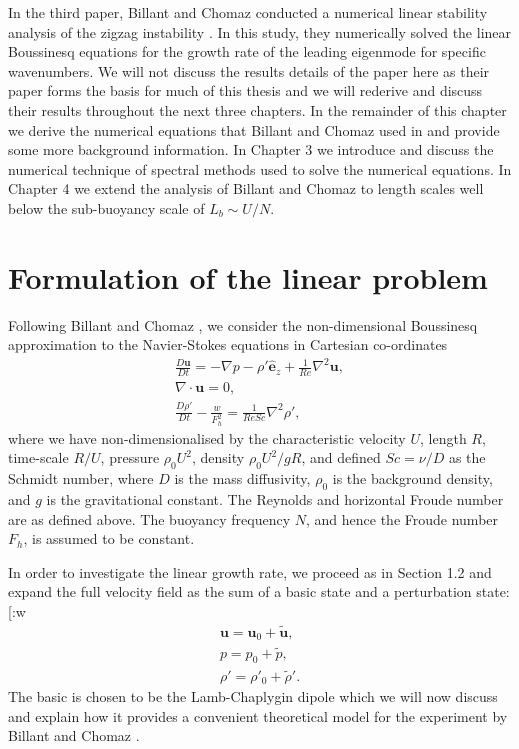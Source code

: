 In the third paper, Billant and Chomaz conducted a numerical linear stability analysis of the zigzag instability \cite{bc2000c}. In this study, they numerically solved the linear Boussinesq equations for the growth rate of the leading eigenmode for specific wavenumbers. We will not discuss the results details of the paper here as their paper forms the basis for much of this thesis and we will rederive and discuss their results throughout the next three chapters. In the remainder of this chapter we derive the numerical equations that Billant and Chomaz used in \cite{bc2000c} and provide some more background information. In Chapter 3 we introduce and discuss the numerical technique of spectral methods used to solve the numerical equations. In Chapter 4 we extend the analysis of Billant and Chomaz to length scales well below the sub-buoyancy scale of $L_{b}\sim U/N$. 

\section{Formulation of the linear problem}
Following Billant and Chomaz \cite{bc2000c}, we consider the non-dimensional Boussinesq approximation to the Navier-Stokes equations in Cartesian co-ordinates 
\begin{align}
\frac{D\bm{u}}{Dt} = -\nabla p - \rho'\hat{\bm{e}}_{z} + \frac{1}{Re}\nabla^{2} \bm{u},\\
\nabla \cdot \bm{u}=0,\\
\frac{D\rho'}{Dt} -\frac{w}{F_{h}^{2}} = \frac{1}{ReSc}\nabla^{2} \rho',
\end{align}
where we have non-dimensionalised by the characteristic velocity $U$, length $R$, time-scale $R/U$, pressure $\rho_{0}U^{2}$, density $\rho_{0}U^{2}/gR$, and defined $Sc=\nu /D$ as the Schmidt number, where $D$ is the mass diffusivity, $\rho_{0}$ is the background density, and $g$ is the gravitational constant. The Reynolds and horizontal Froude number are as defined above. The buoyancy frequency $N$, and hence the Froude number $F_{h}$, is assumed to be constant. 

In order to investigate the linear growth rate, we proceed as in Section 1.2 and expand the full velocity field as the sum of a basic state and a perturbation state:[:w
\begin{align}
\bm{u} = \bm{u}_{0} + \tilde{\bm{u}},\\
p = p_{0} + \tilde{p},\\
\rho' = \rho'_{0} + \tilde{\rho}'.
\end{align}
The basic is chosen to be the Lamb-Chaplygin dipole which we will now discuss and explain how it provides a convenient theoretical model for the experiment by Billant and Chomaz \cite{bc2000a}.


